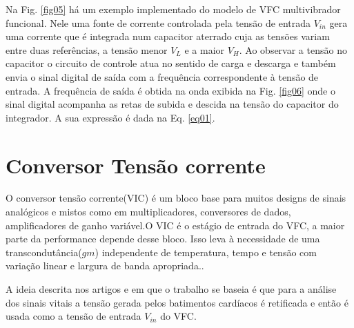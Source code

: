 Na Fig. \ref{fig05} há um exemplo implementado do modelo de VFC multivibrador funcional. Nele uma fonte de corrente controlada pela tensão de entrada $V_{in}$ gera uma corrente que é integrada num capacitor aterrado cuja as tensões variam entre duas referências, a tensão menor $V_L$ e a maior $V_H$. Ao observar a tensão no capacitor o circuito de controle atua no sentido de carga e descarga e também envia o sinal digital de saída com a frequência correspondente à tensão de entrada.  
A frequência de saída é obtida na onda exibida na Fig. \ref{fig06} onde o sinal digital acompanha as retas de subida e descida na tensão do capacitor do integrador. A sua expressão é dada na Eq. \ref{eq01}. 

\section{Conversor Tensão corrente} 

O conversor tensão corrente(VIC) é um bloco base para muitos designs de sinais analógicos e mistos como em multiplicadores, conversores de dados, amplificadores de ganho variável.O VIC é o estágio de entrada do VFC, a maior parte  da performance depende desse bloco. Isso leva à necessidade de uma transcondutância($gm$) independente de temperatura, tempo e tensão com variação linear e largura de banda apropriada.\cite{livroprincipal}.

A ideia descrita nos artigos \cite{artigo_principal} e \cite{artigo_tag_unb} em que o trabalho se baseia é que para a análise dos sinais vitais a tensão gerada pelos batimentos cardíacos é retificada e então é usada como a tensão de entrada $V_{in}$ do VFC. 

